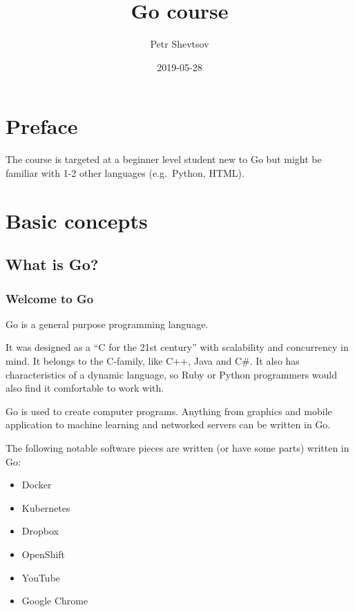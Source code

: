 \documentclass[]{book}
\title{Go course}
\author{Petr Shevtsov}
\date{2019-05-28}
\providecommand{\tightlist}{%
  \setlength{\itemsep}{0pt}\setlength{\parskip}{0pt}}
\begin{document}
\maketitle

{
\setcounter{tocdepth}{1}
\tableofcontents
}
\hypertarget{preface}{%
\chapter*{Preface}\label{preface}}

The course is targeted at a beginner level student new to Go but might be
familiar with 1-2 other languages (e.g.~Python, HTML).

\hypertarget{basic-concepts}{%
\chapter{Basic concepts}\label{basic-concepts}}

\hypertarget{what-is-go}{%
\section{What is Go?}\label{what-is-go}}

\hypertarget{welcome-to-go}{%
\subsection{Welcome to Go}\label{welcome-to-go}}

Go is a general purpose programming language.

It was designed as a ``C for the 21st century'' with scalability and concurrency
in mind. It belongs to the C-family, like C++, Java and C\#. It also has
characteristics of a dynamic language, so Ruby or Python programmers would also
find it comfortable to work with.

Go is used to create computer programs. Anything from graphics and mobile
application to machine learning and networked servers can be written in Go.

The following notable software pieces are written (or have some parts) written
in Go:

\begin{itemize}
\tightlist
\item
  Docker
\item
  Kubernetes
\item
  Dropbox
\item
  OpenShift
\item
  YouTube
\item
  Google Chrome
\end{itemize}
\end{document}
